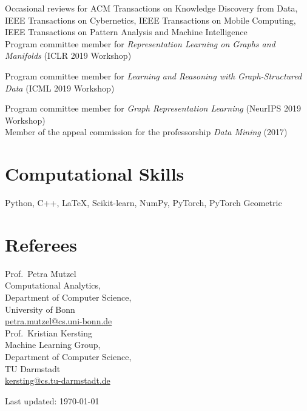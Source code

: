 \documentclass[11pt, a4paper]{scrartcl}
\begin{document}
Occasional reviews for ACM Transactions on Knowledge Discovery from Data, IEEE Transactions on Cybernetics, IEEE Transactions on Mobile Computing, IEEE Transactions on Pattern Analysis and Machine Intelligence\\


Program committee member for \emph{Representation Learning on Graphs and Manifolds} (ICLR 2019 Workshop)

Program committee member for \emph{Learning and Reasoning with Graph-Structured Data} (ICML 2019 Workshop)

Program committee member for  \emph{Graph Representation Learning} (NeurIPS 2019 Workshop)\\

Member of the appeal commission for the professorship \emph{Data Mining} (2017)

\section*{Computational Skills}
Python, C++, \LaTeX, Scikit-learn, NumPy, PyTorch, PyTorch Geometric

\section*{Referees}
Prof.~Petra Mutzel\\
Computational Analytics,\\ 
Department of Computer Science,\\
University of Bonn \\
\href{mailto:petra.mutzel@cs.uni-bonn.de}{petra.mutzel@cs.uni-bonn.de}\\


Prof.~Kristian Kersting\\ 
Machine Learning Group,\\
Department of Computer Science,\\
TU Darmstadt\\
\href{mailto:kersting@cs.tu-darmstadt.de}{kersting@cs.tu-darmstadt.de}\\

\vfill{} 
\begin{center}
{\scriptsize Last updated: \today}
\end{center}
\end{document}
